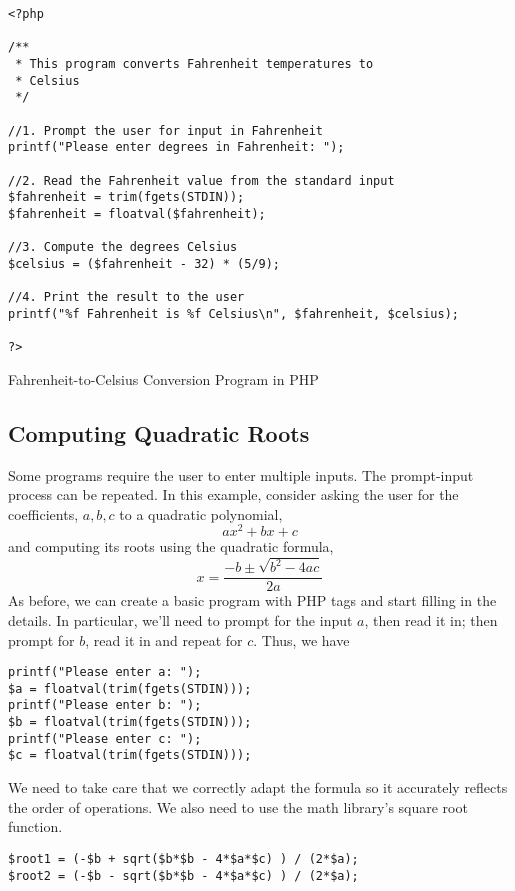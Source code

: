 \begin{listing}[H]
\begin{verbatim}
<?php

/**
 * This program converts Fahrenheit temperatures to
 * Celsius
 */

//1. Prompt the user for input in Fahrenheit
printf("Please enter degrees in Fahrenheit: ");

//2. Read the Fahrenheit value from the standard input
$fahrenheit = trim(fgets(STDIN));
$fahrenheit = floatval($fahrenheit);

//3. Compute the degrees Celsius
$celsius = ($fahrenheit - 32) * (5/9);

//4. Print the result to the user
printf("%f Fahrenheit is %f Celsius\n", $fahrenheit, $celsius);

?>
\end{verbatim}
\caption{Fahrenheit-to-Celsius Conversion Program in PHP}
\label{code:php:fahrenheitToCelsiusProgram}
\end{listing}

\subsection{Computing Quadratic Roots}

Some programs require the user to enter multiple inputs.  The 
prompt-input process can be repeated.  In this example, consider asking
the user for the coefficients, $a, b, c$ to a quadratic polynomial, 
  $$ax^2 + bx + c$$
and computing its roots using the quadratic formula, 
  $$x = \frac{-b \pm \sqrt{b^2 - 4ac}}{2a}$$
As before, we can create a basic program with PHP tags and start 
filling in the details.  In particular, we'll need to prompt
for the input $a$, then read it in; then prompt for $b$, read it in and
repeat for $c$.  Thus, we have 

\begin{verbatim}
printf("Please enter a: ");
$a = floatval(trim(fgets(STDIN)));
printf("Please enter b: ");
$b = floatval(trim(fgets(STDIN)));
printf("Please enter c: ");
$c = floatval(trim(fgets(STDIN)));
\end{verbatim}

We need to take care that we correctly adapt the formula so it accurately 
reflects the order of operations.  We also need to use the math library's 
square root function.  

\begin{verbatim}
$root1 = (-$b + sqrt($b*$b - 4*$a*$c) ) / (2*$a);
$root2 = (-$b - sqrt($b*$b - 4*$a*$c) ) / (2*$a);
\end{verbatim}

